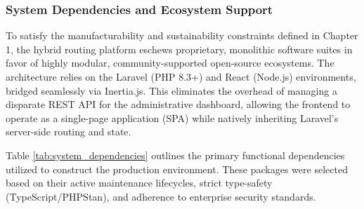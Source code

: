 \documentclass[a4paper]{report}
\begin{document}
{\begin{itemize}
\begin{itemize}
\subsubsection{System Dependencies and Ecosystem Support}

To satisfy the manufacturability and sustainability constraints defined in Chapter 1, the hybrid routing platform eschews proprietary, monolithic software suites in favor of highly modular, community-supported open-source ecosystems. The architecture relies on the Laravel (PHP 8.3+) and React (Node.js) environments, bridged seamlessly via Inertia.js. This eliminates the overhead of managing a disparate REST API for the administrative dashboard, allowing the frontend to operate as a single-page application (SPA) while natively inheriting Laravel's server-side routing and state.

Table \ref{tab:system_dependencies} outlines the primary functional dependencies utilized to construct the production environment. These packages were selected based on their active maintenance lifecycles, strict type-safety (TypeScript/PHPStan), and adherence to enterprise security standards.

\begin{table}[htpb]
\centering
\caption{Core Functional Dependencies across the Hybrid Architecture}
\label{tab:system_dependencies}
\end{table}


\end{itemize}
\end{itemize}}
\end{document}
